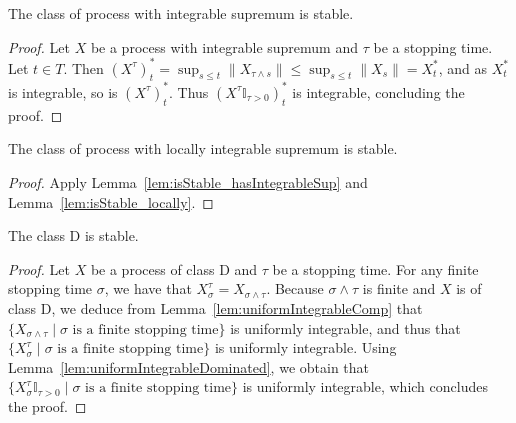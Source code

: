 \begin{lemma}\label{lem:isStable_hasIntegrableSup}
  \leanok
The class of process with integrable supremum is stable.
\end{lemma}

\begin{proof}\leanok
Let $X$ be a process with integrable supremum and $\tau$ be a stopping time. Let $t \in T$. Then $(X^\tau)^*_t = \sup_{s \le t} \|X_{\tau \land s}\| \le \sup_{s \le t} \|X_s\| = X^*_t$, and as $X^*_t$ is integrable, so is $(X^\tau)^*_t$. Thus $(X^\tau \mathbb{I}_{\tau > 0})^*_t$ is integrable, concluding the proof.
\end{proof}

\begin{lemma}\label{lem:isStable_hasLocallyIntegrableSup}
  \leanok
The class of process with locally integrable supremum is stable.
\end{lemma}

\begin{proof}\leanok
Apply Lemma~\ref{lem:isStable_hasIntegrableSup} and Lemma~\ref{lem:isStable_locally}.
\end{proof}


\begin{lemma}\label{lem:isStable_classD}
  \leanok
The class D is stable.
\end{lemma}

\begin{proof}\leanok
Let $X$ be a process of class D and $\tau$ be a stopping time. For any finite stopping time $\sigma$, we have that $X_\sigma^\tau = X_{\sigma \land \tau}$. Because $\sigma \land \tau$ is finite and $X$ is of class D, we deduce from Lemma~\ref{lem:uniformIntegrableComp} that $\{X_{\sigma \land \tau} \mid \sigma \text{ is a finite stopping time}\}$ is uniformly integrable, and thus that $\{X^\tau_\sigma \mid \sigma \text{ is a finite stopping time}\}$ is uniformly integrable. Using Lemma~\ref{lem:uniformIntegrableDominated}, we obtain that $\{X^\tau_\sigma \mathbb{I}_{\tau > 0} \mid \sigma \text{ is a finite stopping time}\}$ is uniformly integrable, which concludes the proof.
\end{proof}


